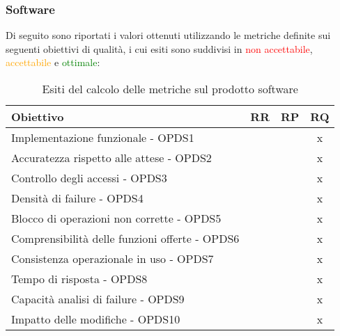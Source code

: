 \documentclass[PdQ.tex]{subfiles}
\begin{document}
	\subsubsection{Software}
	Di seguito sono riportati i valori ottenuti utilizzando le metriche definite sui seguenti obiettivi di qualità, i cui esiti sono suddivisi in \textcolor{red}{non accettabile}, \textcolor{orange}{accettabile} e \textcolor{green}{ottimale}:
	\begin{table}[h]
				\centering
				\begin{tabular}{l c c c}
					\hline
					\rule[-0.3cm]{0cm}{0.8cm}
					\textbf{Obiettivo} & \textbf{RR} & \textbf{RP} & \textbf{RQ}\\
					\hline
					\rule[0cm]{0cm}{0.4cm}
					Implementazione funzionale - OPDS1 & & & x \\
					\rule[0cm]{0cm}{0.4cm}
					Accuratezza rispetto alle attese - OPDS2 & & & x \\
					\rule[0cm]{0cm}{0.4cm}
					Controllo degli accessi - OPDS3 & & & x \\
					\rule[0cm]{0cm}{0.4cm}
					Densità di failure - OPDS4 & & & x \\
					\rule[0cm]{0cm}{0.4cm}
					Blocco di operazioni non corrette - OPDS5 & & & x \\
					\rule[0cm]{0cm}{0.4cm}
					Comprensibilità delle funzioni offerte - OPDS6 & & & x \\
					\rule[0cm]{0cm}{0.4cm}
					Consistenza operazionale in uso - OPDS7 & & & x \\
					\rule[0cm]{0cm}{0.4cm}
					Tempo di risposta - OPDS8 & & & x \\
					\rule[0cm]{0cm}{0.4cm}
					Capacità analisi di failure - OPDS9 & & & x \\
					\rule[0cm]{0cm}{0.4cm}
					Impatto delle modifiche - OPDS10 & & & x \\
					\hline
				\end{tabular}
				\caption{Esiti del calcolo delle metriche sul prodotto software}
			\end{table}		
\end{document}
